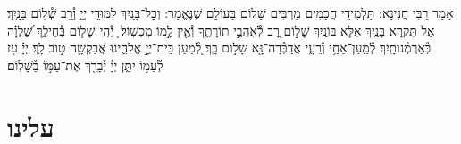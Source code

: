 \documentclass[twoside, openany, parskip=half, 11pt]{book}
\begin{document}
\vspace{-.3\baselineskip}
אָמַר רַבִּי חֲנִינָא: תַּלְמִידֵי חֲכָמִים מַרְבִּים שָׁלוֹם בָּעוֹלָם שֶׁנֶּאֱמַר: וְכׇל־בָּנַ֖יִךְ לִמּוּדֵ֣י יְיָ֑ וְ֯רַ֖ב שְׁ֯ל֥וֹם בָּנָֽיִךְ׃ אַל תִּקְרָא בָּנַֽיִךְ אֶלָּא בּוֹנַֽיִךְ שָׁל֣וֹם רָ֭ב לְ֯אֹֽהֲבֵ֣י תוֹרָתֶ֑ךָ וְ֯אֵ֖ין לָ֣מוֹ מִכְשֽׁוֹל׃  ֖ יְ֯הִֽי־שָׁל֥וֹם בְּ֯חֵילֵ֑ךְ שַׁ֝לְוָ֗ה בְּ֯אַרְמְ֯נוֹתָֽיִךְ׃ לְ֯מַֽעַן־אַחַ֥י וְ֯רֵעָ֑י אֲדַבְּ֯רָה־נָּ֖א שָׁל֣וֹם בָּֽךְ׃ לְ֭֯מַעַן בֵּית־יְיָ֣ אֱלֹהֵ֑ינוּ אֲבַקְשָׁ֖ה ט֣וֹב לָֽךְ׃ יְיָ֗ עֹ֖ז לְ֯עַמּ֣וֹ יִתֵּ֑ן יְיָ֓ יְ֯בָרֵ֖ךְ אֶת־עַמּ֣וֹ בַ֯שָּׁלֽוֹם׃

\rabbiskaddish

\section*{ עלינו }

\aleinu

\vspace{-1\baselineskip}
\end{document}
